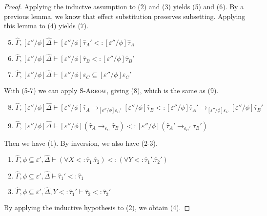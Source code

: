 \documentclass{llncs}
\begin{document}
\begin{proof}
Applying the inductve assumption to (2) and (3) yields (5) and (6). By a previous lemma, we know that effect substitution preserves subsetting. Applying this lemma to (4) yields (7).

\begin{enumerate}
	\setcounter{enumi}{4}
	\item $\hat \Gamma, [\varepsilon''/\phi]\hat \Delta \vdash [\varepsilon''/\phi]\hat \tau_A' <: [\varepsilon''/\phi]\hat \tau_A$
	\item $\hat \Gamma, [\varepsilon''/\phi]\hat \Delta \vdash [\varepsilon''/\phi]\hat \tau_B <: [\varepsilon''/\phi]\hat \tau_B'$
	\item $\hat \Gamma, [\varepsilon''/\phi]\hat \Delta \vdash [\varepsilon''/\phi]\varepsilon_C \subseteq [\varepsilon''/\phi]\varepsilon_C'$ 
\end{enumerate}

With (5-7) we can apply \textsc{S-Arrow}, giving (8), which is the same as (9).

\begin{enumerate}
	\setcounter{enumi}{7}
	\item $\hat \Gamma, [\varepsilon''/\phi]\hat \Delta \vdash [\varepsilon''/\phi]\hat \tau_A \rightarrow_{[\varepsilon''/\phi]\varepsilon_C'} [\varepsilon''/\phi]\hat \tau_B <: [\varepsilon''/\phi]\hat \tau_A' \rightarrow_{[\varepsilon''/\phi]\varepsilon_C} [\varepsilon''/\phi]\hat \tau_B'$
	\item $\hat \Gamma, [\varepsilon''/\phi]\hat \Delta \vdash [\varepsilon''/\phi](\hat \tau_A \rightarrow_{\varepsilon_C} \hat \tau_B) <: [\varepsilon''/\phi](\hat \tau_A' \rightarrow_{\varepsilon_C'} \hat \tau_B')$
\end{enumerate}

 Then we have (1). By inversion, we also have (2-3).

\begin{enumerate}
	\item $\hat \Gamma, \phi \subseteq \varepsilon', \hat \Delta \vdash (\forall X <: \hat \tau_1. \hat \tau_2) <: (\forall Y <: \hat \tau_1'. \hat \tau_2')$
	\item $\hat \Gamma, \phi \subseteq \varepsilon', \hat \Delta \vdash \hat \tau_1' <: \hat \tau_1$
	\item $\hat \Gamma, \phi \subseteq \varepsilon', \hat \Delta, Y <: \hat \tau_1' \vdash \hat \tau_2 <: \hat \tau_2'$
\end{enumerate}

By applying the inductive hypothesis to (2), we obtain (4).


\end{proof}
\end{document}
